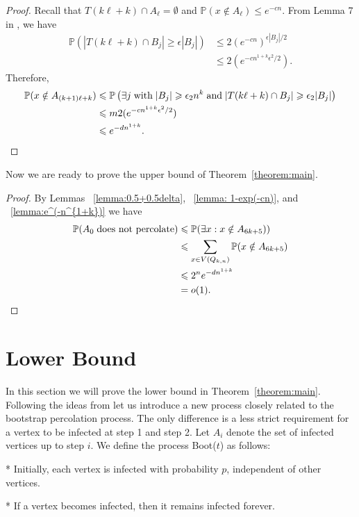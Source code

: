 \documentclass[reqno,11pt]{amsart}
\renewcommand{\leq}{\leqslant}
\renewcommand{\geq}{\geqslant}
\begin{document}
\begin{proof}
Recall that  $T(k\ell+k) \cap A_{\ell} =\emptyset$ and  $\mathbb{P}(x \notin A_{\ell}) \leq e^{-cn}$. From Lemma 7 in \cite{balogh2007majority}, we have
\begin{align*}
   \mathbb{P}(|T(k\ell+k) \cap B_j| \geq \epsilon|B_j|) & \leq 2(e^{-cn})^{\epsilon|B_j|/2}\\
   &\leq 2(e^{-cn^{1+k}\epsilon^2 /2}).
\end{align*}
Therefore, 
\begin{align*}
   \mathbb{P}(x \notin A_{(k+1)\ell+k}) &\leq \mathbb{P}\left( \exists j \; \text{with} \; |B_j|\geq \epsilon_2 n^k \; \text{and} \; |T(k\ell+k) \cap B_j|\geq \epsilon_2|B_j|\right)\\
   & \leq m2(e^{-cn^{1+k}\epsilon^2 /2})\\
   & \leq e^{-dn^{1+k}}. \qedhere
\end{align*}
\end{proof}
Now we are ready to prove the upper bound of Theorem~\ref{theorem:main}. 
\begin{proof}

By Lemmas ~\ref{lemma:0.5+0.5delta}, ~\ref{lemma: 1-exp(-cn)}, and ~\ref{lemma:e^(-n^{1+k})} we have 
\begin{align*}
    \mathbb{P}(A_0 \; \text{does not percolate} ) & \leq \mathbb{P}(\exists x: x \notin A_{6k+5}))\\
    & \leq \sum_{x \in V(Q_{k,n})} \mathbb{P}(x \notin A_{6k+5})\\
    & \leq 2^ne^{-dn^{1+k}}\\
    & =o(1). \qedhere
\end{align*} 
\end{proof}


\section{Lower Bound}
In this section we will prove the lower bound in Theorem~\ref{theorem:main}. Following the ideas from \cite{balogh_bollobas_morris_2009} let us introduce a new process closely related to the bootstrap percolation process. The only difference is a less strict requirement for a vertex to be infected at step 1 and step 2. Let $A_i$ denote the set of infected vertices up to step $i$. We define the process Boot($t$) as follows:

* Initially, each vertex is infected with probability $p$, independent of other vertices.

* If a vertex becomes infected, then it remains infected forever.
\end{document}
